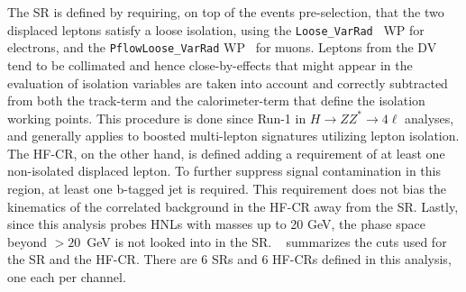 The SR is defined by requiring, on top of the events pre-selection, that the two displaced leptons satisfy a loose isolation, using the \texttt{Loose\_VarRad}~\cite{EGAM-2018-01} WP for electrons, and the \texttt{PflowLoose\_VarRad} WP~\cite{MUON-2018-03} for muons. Leptons from the DV tend to be collimated and hence close-by-effects that might appear in the evaluation of isolation variables are taken into account and correctly subtracted from both the track-term and the calorimeter-term that define the isolation working points. This procedure is done since Run-1 in $H\to ZZ^*\to 4\ell$ analyses, and generally applies to boosted multi-lepton signatures utilizing lepton isolation. The HF-CR, on the other hand, is defined adding a requirement of at least one non-isolated displaced lepton. To further suppress signal contamination in this region, at least one b-tagged jet is required. This requirement does not bias the kinematics of the correlated background in the HF-CR away from the SR. Lastly, since this analysis probes HNLs with masses up to 20 GeV, the phase space beyond \mhnl$>20$~GeV is not looked into in the SR. ~ summarizes the cuts used for the SR and the HF-CR. There are 6 SRs and 6 HF-CRs defined in this analysis, one each per channel.

